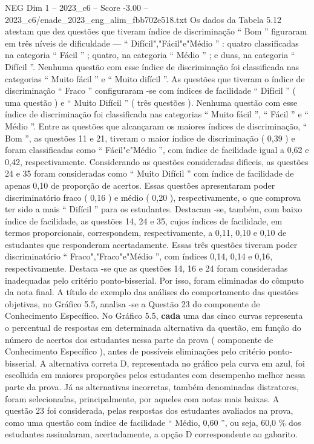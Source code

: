 \begin{textsample}{NEG Dim 1 – 2023\_c6 – Score -3.00 – 2023\_c6/enade\_2023\_eng\_alim\_fbb702e518.txt}
Os dados da Tabela 5.12 atestam que dez questões que tiveram índice de discriminação “ Bom ” figuraram em três níveis de dificuldade — “ Difícil","Fácil"e"Médio ” : quatro classificadas na categoria “ Fácil ” ; quatro, na categoria “ Médio ” ; e duas, na categoria “ Difícil ”.
Nenhuma questão com esse índice de discriminação foi classificada nas categorias “ Muito fácil ” e “ Muito difícil ”.
As questões que tiveram o índice de discriminação “ Fraco ” configuraram -se com índices de facilidade “ Difícil ” ( uma questão ) e “ Muito Difícil ” ( três questões ).
Nenhuma questão com esse índice de discriminação foi classificada nas categorias “ Muito fácil ”, “ Fácil ” e “ Médio ”.
Entre as questões que alcançaram os maiores índices de discriminação, “ Bom ”, as questões 11 e 21, tiveram o maior índice de discriminação ( 0,39 ) e foram classificadas como “ Fácil"e"Médio ”, com índice de facilidade igual a 0,62 e 0,42, respectivamente.
Considerando as questões consideradas dificeis, as questões 24 e 35 foram consideradas como “ Muito Difícil ” com índice de facilidade de apenas 0,10 de proporção de acertos.
Essas questões apresentaram poder discriminatório fraco ( 0,16 ) e médio ( 0,20 ), respectivamente, o que comprova ter sido a mais “ Difícil ” para os estudantes.
Destacam -se, também, com baixo índice de facilidade, as questões 14, 24 e 35, cujos índices de facilidade, em termos proporcionais, correspondem, respectivamente, a 0,11, 0,10 e 0,10 de estudantes que responderam acertadamente.
Essas três questões tiveram poder discriminatório “ Fraco","Fraco"e"Médio ”, com índices 0,14, 0,14 e 0,16, respectivamente.
Destaca -se que as questões 14, 16 e 24 foram consideradas inadequadas pelo critério ponto-bisserial.
Por isso, foram eliminadas do cômputo da nota final.
A título de exemplo das análises do comportamento das questões objetivas, no Gráfico 5.5, analisa -se a Questão 23 do componente de Conhecimento Específico.
No Gráfico 5.5, \textbf{cada} uma das cinco curvas representa o percentual de respostas em determinada alternativa da questão, em função do número de acertos dos estudantes nessa parte da prova ( componente de Conhecimento Específico ), antes de possíveis eliminações pelo critério ponto-bisserial.
A alternativa correta D, representada no gráfico pela curva em azul, foi escolhida em maiores proporções pelos estudantes com desempenho melhor nessa parte da prova.
Já as alternativas incorretas, também denominadas distratores, foram selecionadas, principalmente, por aqueles com notas mais baixas.
A questão 23 foi considerada, pelas respostas dos estudantes avaliados na prova, como uma questão com índice de facilidade “ Médio, 0,60 ”, ou seja, 60,0 \% dos estudantes assinalaram, acertadamente, a opção D correspondente ao gabarito.

\end{textsample}

